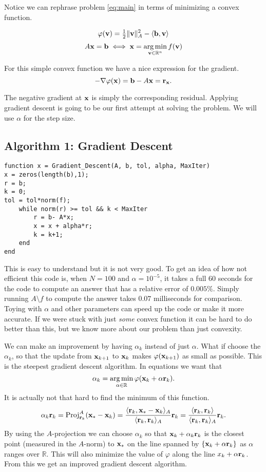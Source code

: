 \documentclass{article}
\newcommand{\bx}{{\bf x}}
\newcommand{\bb}{{\bf b}}
\newcommand{\br}{{\bf r}}
\newcommand{\bv}{{\bf v}}
\newcommand{\R}{\mathbb{R}}
\newcommand{\beq}{\begin{equation}}
\newcommand{\eeq}{\end{equation}}
\DeclareMathOperator*{\argmin}{arg\,min}
\theoremstyle{remark}
\begin{document}
Notice we can rephrase problem \eqref{eq:main} in terms of minimizing a convex function.

\beq
\varphi(\bv) = \tfrac{1}{2}\|\bv\|_A^2 - \langle \bb, \bv \rangle 
\eeq
\beq
A\bx = \bb \iff \bx = \argmin_{\bv \in \R^n} f(\bv)
\eeq


For this simple convex function we have a nice expression for the gradient. 
\begin{equation}
-\nabla \varphi(\bx) = \bb - A\bx  = \br_{\bx}.
\end{equation}

The negative gradient at $\bx$ is simply the corresponding residual. Applying gradient descent is going to be our first attempt at solving the problem. We will use $\alpha$ for the step size. 

\subsection{Algorithm 1: Gradient Descent}
\begin{lstlisting}
function x = Gradient_Descent(A, b, tol, alpha, MaxIter)
x = zeros(length(b),1);
r = b;
k = 0;   
tol = tol*norm(f);
    while norm(r) >= tol && k < MaxIter
        r = b- A*x;
        x = x + alpha*r;
        k = k+1;
    end
end
\end{lstlisting}

This is easy to understand but it is not very good. To get an idea of how not efficient this code is, when $N = 100$ and $\alpha = 10^{-5}$, it takes a full 60 seconds for the code to compute an answer that has a relative error of $0.005\%$. Simply running $A\setminus f$ to compute the answer takes $0.07$ milliseconds for comparison. Toying with $\alpha$ and other parameters can speed up the code or make it more accurate. If we were stuck with just \textit{some} convex function it can be hard to do better than this, but we know more about our problem than just convexity. 


We can make an improvement by having $\alpha_k$ instead of just $\alpha$. What if choose the $\alpha_k$, so that the update from $\bx_{k+1}$ to $\bx_k$ makes $\varphi(\bx_{k+1})$ as small as possible. This is the steepest gradient descent algorithm. In equations we want that
\beq
\alpha_k = \argmin_{\alpha \in \R} \varphi(\bx_k + \alpha\br_k ).
\eeq
It is actually not that hard to find the minimum of this function. 
\beq
\alpha_k \br_k = \text{Proj}^A_{\br_k}(\bx_* - \bx_k) = \frac{\langle \br_k, \bx_*-\bx_k \rangle_A }{\langle \br_k , \br_k \rangle_A} \br_k = \frac{\langle \br_k, \br_k \rangle }{\langle \br_k , \br_k \rangle_A} \br_k.
\eeq
By using the $A$-projection we can choose $\alpha_k$ so that $\bx_k + \alpha_k\br_k$ is the closest point (measured in the $A$-norm) to $\bx_*$ on the line spanned by $\{\bx_k + \alpha \br_k \}$ as $\alpha$ ranges over $\R$. This will also minimize the value of $\varphi$ along the line $x_k + \alpha \br_k$. From this we get an improved gradient descent algorithm. 
\end{document}
